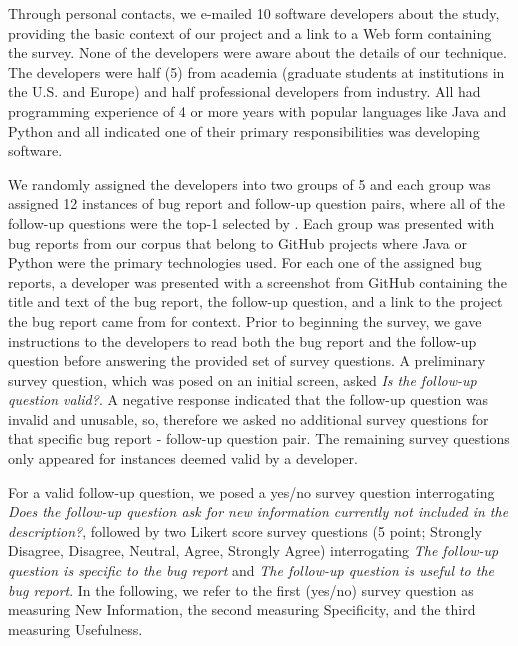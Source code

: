 Through personal contacts, we e-mailed 10 software developers about the study, providing the basic context of our project
and a link to a Web form containing the survey. None of the developers were
aware about the details of our technique. The developers were half (5) from academia (graduate students at
institutions in the U.S. and Europe) and half professional developers from industry. All had programming
experience of 4 or more years with popular languages like Java and Python and all indicated one of their primary
responsibilities was developing software.

We randomly assigned the developers into two groups of 5 and each group was assigned 12 instances of bug report and follow-up question pairs, where all of the follow-up questions were the top-1 selected by \evpi. Each group was presented with bug reports from our corpus that belong to GitHub projects where Java or Python were the primary technologies used. For each one of the assigned bug reports, a developer
was presented with a screenshot from GitHub containing the title and text of the bug report, the follow-up question, and a link to the project the bug report came from for context. Prior to beginning the survey, we gave instructions to the developers to read both the bug report and the follow-up question before answering the provided set of survey questions. A preliminary survey question, which was posed on an initial screen, asked {\em Is the follow-up question valid?}. A negative response indicated that the follow-up question was invalid and unusable, so, therefore we asked no additional survey questions for that specific bug report - follow-up question pair. The remaining survey questions only appeared for instances deemed valid by a developer.

For a valid follow-up question, we posed a yes/no survey question interrogating {\em Does the follow-up question ask for new information currently not included in the description?}, followed by two Likert score survey questions (5 point; Strongly Disagree, Disagree, Neutral, Agree, Strongly Agree) interrogating {\em The follow-up question is specific to the bug report} and {\em The follow-up question is useful to the bug report}. In the following, we refer to the first (yes/no) survey question as measuring New Information, the second measuring Specificity, and the third measuring Usefulness.

